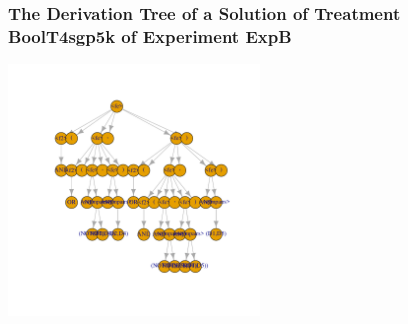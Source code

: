  \begin{frame}
 \frametitle{ The Derivation Tree of a Solution of Treatment BoolT4sgp5k of Experiment ExpB }
 \begin{center}
\includegraphics[width=0.5\textwidth, angle=0]
{ExpBDerivationTreeFigure023.pdf}
 \end{center}
 \label{report/ExpBDerivationTreeFigure023.pdf}  
 \end{frame}

